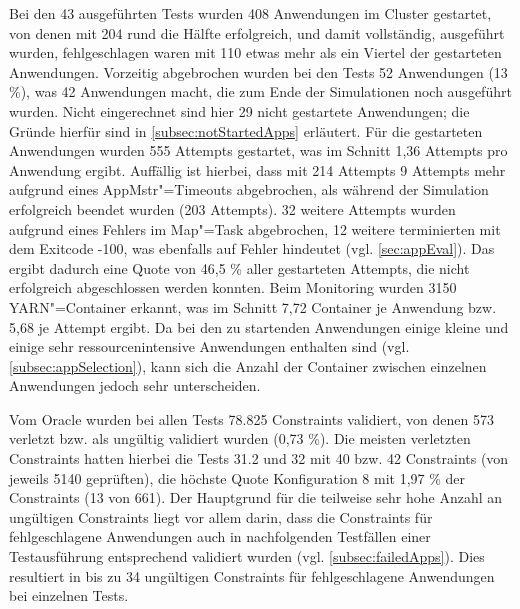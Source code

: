 Bei den 43 ausgeführten Tests wurden 408 Anwendungen im Cluster gestartet, von denen mit 204 rund die Hälfte erfolgreich, und damit vollständig, ausgeführt wurden, fehlgeschlagen waren mit 110 etwas mehr als ein Viertel der gestarteten Anwendungen.
Vorzeitig abgebrochen wurden bei den Tests 52 Anwendungen (13 \%), was 42 Anwendungen macht, die zum Ende der Simulationen noch ausgeführt wurden.
Nicht eingerechnet sind hier 29 nicht gestartete Anwendungen; die Gründe hierfür sind in \cref{subsec:notStartedApps} erläutert.
Für die gestarteten Anwendungen wurden 555 Attempts gestartet, was im Schnitt 1,36 Attempts pro Anwendung ergibt.
Auffällig ist hierbei, dass mit 214 Attempts 9 Attempts mehr aufgrund eines \gls{AppMstr}"=Timeouts abgebrochen, als während der Simulation erfolgreich beendet wurden (203 Attempts).
32 weitere Attempts wurden aufgrund eines Fehlers im Map"=Task abgebrochen, 12 weitere terminierten mit dem Exitcode -100, was ebenfalls auf Fehler hindeutet (vgl. \cref{sec:appEval}).
Das ergibt dadurch eine Quote von 46,5 \% aller gestarteten Attempts, die nicht erfolgreich abgeschlossen werden konnten.
Beim Monitoring wurden 3150 YARN"=Container erkannt, was im Schnitt 7,72 Container je Anwendung bzw. 5,68 je Attempt ergibt.
Da bei den zu startenden Anwendungen einige kleine und einige sehr ressourcenintensive Anwendungen enthalten sind (vgl. \cref{subsec:appSelection}), kann sich die Anzahl der Container zwischen einzelnen Anwendungen jedoch sehr unterscheiden.

Vom Oracle wurden bei allen Tests 78.825 Constraints validiert, von denen 573 verletzt bzw. als ungültig validiert wurden (0,73 \%).
Die meisten verletzten Constraints hatten hierbei die Tests 31.2 und 32 mit 40 bzw. 42 Constraints (von jeweils 5140 geprüften), die höchste Quote Konfiguration 8 mit 1,97 \% der Constraints (13 von 661).
Der Hauptgrund für die teilweise sehr hohe Anzahl an ungültigen Constraints liegt vor allem darin, dass die Constraints für fehlgeschlagene Anwendungen auch in nachfolgenden Testfällen einer Testausführung entsprechend validiert wurden (vgl. \cref{subsec:failedApps}).
Dies resultiert in bis zu 34 ungültigen Constraints für fehlgeschlagene Anwendungen bei einzelnen Tests.
